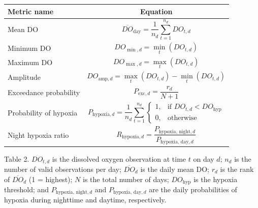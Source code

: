 \begin{table}[t]
\fontsize{12.0pt}{14.0pt}\selectfont
\begin{tabular*}{\linewidth}{@{\extracolsep{\fill}}lc}
\toprule
Metric name & {\bfseries Equation} \\ 
\midrule\addlinespace[2.5pt]
Mean DO & $$\overline{DO}_{\text{day}} = \frac{1}{n_d} \sum_{t=1}^{n_d} DO_{t,d}$$ \\ 
Minimum DO & $$DO_{\min,d} = \min_t(DO_{t,d})$$ \\ 
Maximum DO & $$DO_{\max,d} = \max_t(DO_{t,d})$$ \\ 
Amplitude & $$DO_{\text{amp},d} = \max_t(DO_{t,d}) - \min_t(DO_{t,d})$$ \\ 
Exceedance probability & $$P_{\text{exc},d} = \frac{r_d}{N + 1}$$ \\ 
Probability of hypoxia & $$P_{\text{hypoxia},d} = \frac{1}{n_d} \sum_{t=1}^{n_d}
      \begin{cases}
        1, & \text{if } DO_{t,d} < DO_{\text{hyp}} \\
        0, & \text{otherwise}
      \end{cases}$$ \\ 
Night hypoxia ratio & $$R_{\text{hypoxia},d} = \frac{P_{\text{hypoxia, night},d}}{P_{\text{hypoxia, day},d}}$$ \\ 
\bottomrule
\end{tabular*}
\begin{minipage}{\linewidth}
Table 2. \(DO_{t,d}\) is the dissolved oxygen observation at time \(t\) on day \(d\); \(n_d\) is the number of valid observations per day; \(\overline{DO}_d\) is the daily mean DO; \(r_d\) is the rank of \(\overline{DO}_d\) (1 = highest); \(N\) is the total number of days; \(DO_{\text{hyp}}\) is the hypoxia threshold; and \(P_{\text{hypoxia, night},d}\) and \(P_{\text{hypoxia, day},d}\) are the daily probabilities of hypoxia during nighttime and daytime, respectively.\\
\end{minipage}
\end{table}

